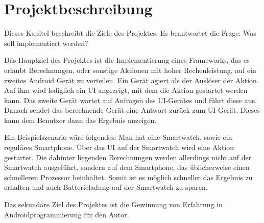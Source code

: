 \chapter{Projektbeschreibung}\label{chap:project}
%
Dieses Kapitel beschreibt die Ziele des Projektes. Es beantwortet die Frage: Was soll implementiert werden?

Das Hauptziel des Projektes ist die Implementierung eines Frameworks, das es erlaubt Berechnungen, oder sonstige Aktionen mit hoher Rechenleistung, auf ein zweites Android Gerät zu verteilen. Ein Gerät agiert als der Auslöser der Aktion. Auf ihm wird lediglich ein UI angezeigt, mit dem die Aktion gestartet werden kann. Das zweite Gerät wartet auf Anfragen des UI-Gerätes und führt diese aus. Danach sendet das berechnende Gerät eine Antwort zurück zum UI-Gerät. Dieses kann dem Benutzer dann das Ergebnis anzeigen.

Ein Beispielszenario wäre folgendes: Man hat eine Smartwatch, sowie ein reguläres Smartphone. Über das UI auf der Smartwatch wird eine Aktion gestartet. Die dahinter liegenden Berechnungen werden allerdings nicht auf der Smartwatch ausgeführt, sondern auf dem Smartphone, das üblicherweise einen schnelleren Prozessor beinhaltet. Somit ist es möglich schneller das Ergebnis zu erhalten und auch Batterieladung auf der Smartwatch zu sparen.

Das sekundäre Ziel des Projektes ist die Gewinnung von Erfahrung in Androidprogrammierung für den Autor.
%